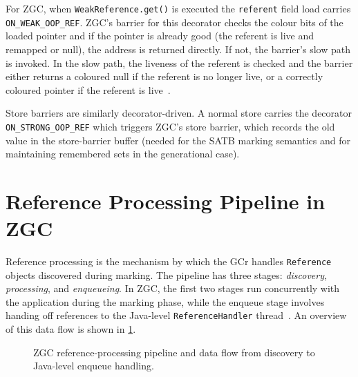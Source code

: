 For \ac{ZGC}, when \texttt{WeakReference.get()} is executed the \texttt{referent} field load carries \texttt{ON\_WEAK\_OOP\_REF}. \ac{ZGC}'s barrier for this decorator checks the colour bits of the loaded pointer and if the pointer is already good (the referent is live and remapped or null), the address is returned directly. If not, the barrier's slow path is invoked. In the slow path, the liveness of the referent is checked and the barrier either returns a coloured null if the referent is no longer live, or a correctly coloured pointer if the referent is live~\cite{openjdk-zbarrier-cpp,openjdk-accessdecorators-hpp}.

Store barriers are similarly decorator-driven. A normal store carries the decorator \texttt{ON\_STRONG\_OOP\_REF} which triggers \ac{ZGC}'s store barrier, which records the old value in the store-barrier buffer (needed for the \ac{SATB} marking semantics and for maintaining remembered sets in the generational case).


\section{Reference Processing Pipeline in ZGC}
\label{sec:bg-refproc}

Reference processing is the mechanism by which the \ac{GCr} handles \texttt{Reference} objects discovered during marking. The pipeline has three stages: \emph{discovery}, \emph{processing}, and \emph{enqueueing}. In \ac{ZGC}, the first two stages run concurrently with the application during the marking phase, while the enqueue stage involves handing off references to the Java-level \texttt{ReferenceHandler} thread~\cite{openjdk-zreferenceprocessor-cpp,openjdk-reference-java}. An overview of this data flow is shown in \cref{fig:zgc-ref-pipeline}.

\begin{figure}[t]
\centering
{}
\caption[\ac{ZGC} reference-processing pipeline]{\ac{ZGC} reference-processing pipeline and data flow from discovery to Java-level enqueue handling.}
\label{fig:zgc-ref-pipeline}
\end{figure}

